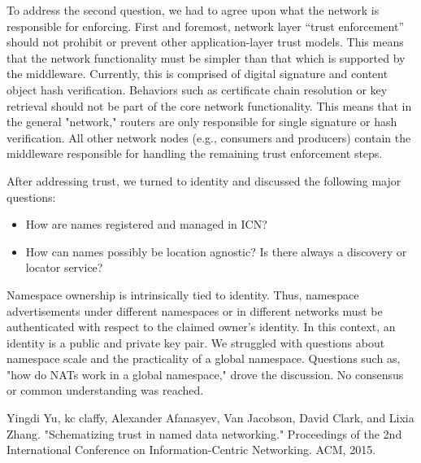 \documentclass[a4paper,UKenglish]{dagrep}
\begin{document}
To address the second question, we had to agree upon what the network is responsible for enforcing.
First and foremost, network layer ``trust enforcement'' should not prohibit or prevent other application-layer trust models. This means that the network functionality must be simpler than that which is supported by the middleware. Currently, this is comprised of digital signature and content object hash verification. Behaviors such as certificate chain resolution or key retrieval should not be part of the core network functionality. This means that in the general "network," routers are only responsible for single signature or hash verification. All other network nodes (e.g., consumers and producers) contain the middleware responsible for handling the remaining trust enforcement steps.

After addressing trust, we turned to identity and discussed the following major questions:
%
\begin{itemize}
\item How are names registered and managed in ICN?
\item How can names possibly be location agnostic? Is there always a discovery or locator service?
\end{itemize}
%
Namespace ownership is intrinsically tied to identity. Thus, namespace advertisements under different namespaces or in different networks must be authenticated with respect to the claimed owner's identity. In this context, an identity is a public and private key pair. We struggled with questions about namespace scale and the practicality of a global namespace. Questions such as, "how do NATs work in a global namespace," drove the discussion. No consensus or common understanding was reached.

\begin{thebibliography}{0}
Yingdi Yu, kc claffy, Alexander Afanasyev, Van Jacobson, David Clark, and Lixia Zhang. "Schematizing trust in named data networking." Proceedings of the 2nd International Conference on Information-Centric Networking. ACM, 2015.
\end{thebibliography}

\license
\end{document}
